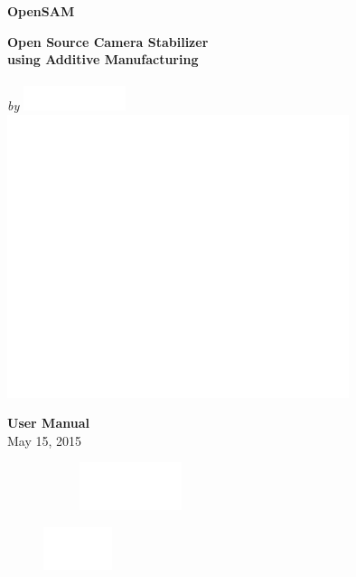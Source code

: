 \begin{titlepage}
\pagecolor{titlepagecolor}
\par
\noindent
\color{white}
\textbf{\textsf{\fontsize{72}{60}\selectfont OpenSAM }}\\[2em]
\par
\noindent
\textbf{\textsf{\fontsize{16}{16}\selectfont Open Source Camera Stabilizer\\using Additive Manufacturing \\}}
\makebox[0pt][l]{\rule{1.3\textwidth}{1pt}}\\[1em]
\textcolor{namecolor}{\textit{\textsf{\fontsize{21}{21}\selectfont by }}} \includegraphics[width=3cm]{OHM.eps} \\[3em]
\includegraphics[width=10cm]{wireframe_frontpage.eps}\\[1cm]
\par
\noindent
\textbf{\textsf{\fontsize{21}{12}\selectfont User Manual}}
\textcolor{namecolor}{\textsf{\fontsize{21}{21}}}\\[1em]
\textcolor{namecolor}{\textsf{\fontsize{12}{21}\selectfont May 15, 2015}}
\\[0cm]
\par
\noindent

\begin{figure}[!h]
    \raggedright
    \begin{subfigure}
        \raggedleft
        \includegraphics[width=3cm]{DTUlogo.eps}
    \end{subfigure}%
    \quad\quad\quad
    \begin{subfigure}
        \raggedright
        \includegraphics[width=2cm]{OHM_FULL_White.png}
    \end{subfigure}
\end{figure}

\end{titlepage}
\restoregeometry %
\nopagecolor%

\newpage